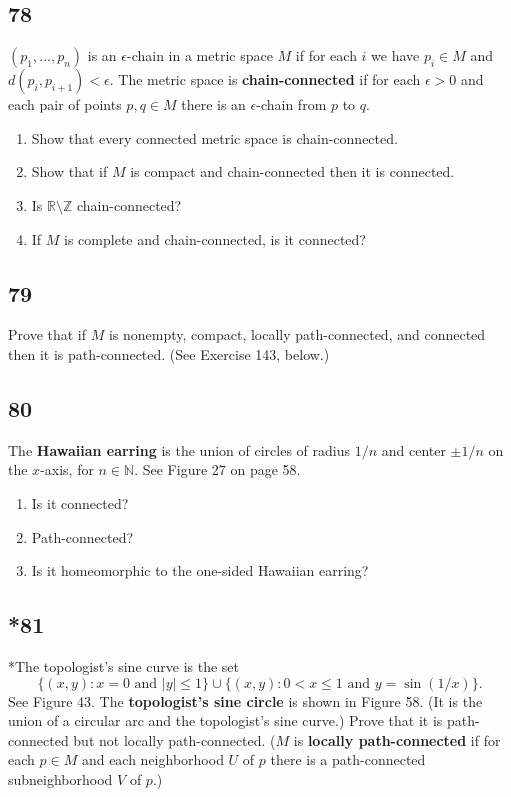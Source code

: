 \documentclass{amsart}
\begin{document}
\subsection*{78}
$(p_1, \ldots, p_n)$ is an $\epsilon$-chain in a metric space $M$ if for each $i$ we have $p_i \in M$ and $d(p_i, p_{i+1}) < \epsilon$. The metric space is \textbf{chain-connected} if for each $\epsilon > 0$ and each pair of points $p,q \in M$ there is an $\epsilon$-chain from $p$ to $q$.
\begin{enumerate}[label=(\alph*)]
\item Show that every connected metric space is chain-connected.
\item Show that if $M$ is compact and chain-connected then it is connected.
\item Is $\mathbb{R} \setminus \mathbb{Z}$ chain-connected?
\item If $M$ is complete and chain-connected, is it connected?
\end{enumerate}

\subsection*{79}
Prove that if $M$ is nonempty, compact, locally path-connected, and connected then it is path-connected. (See Exercise 143, below.)

\subsection*{80}
The \textbf{Hawaiian earring} is the union of circles of radius $1/n$ and center $\pm 1/n$ on the $x$-axis, for $n \in \mathbb{N}$. See Figure 27 on page 58.
\begin{enumerate}[label=(\alph*)]
\item Is it connected?
\item Path-connected?
\item Is it homeomorphic to the one-sided Hawaiian earring?
\end{enumerate}

\subsection*{*81}
*The topologist's sine curve is the set
\[
\{(x,y) : x=0 \text{ and } |y|\le 1\} \cup \{(x,y) : 0 < x \le 1 \text{ and } y = \sin(1/x)\}.
\]
See Figure 43. The \textbf{topologist's sine circle} is shown in Figure 58. (It is the union of a circular arc and the topologist's sine curve.) Prove that it is path-connected but not locally path-connected. ($M$ is \textbf{locally path-connected} if for each $p \in M$ and each neighborhood $U$ of $p$ there is a path-connected subneighborhood $V$ of $p$.)
\end{document}
